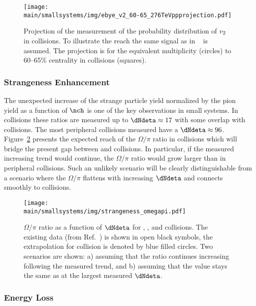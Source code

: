 \documentclass[../report.tex]{subfiles}
\providecommand{\main}{..}
\begin{document}
\begin{figure}[ht]
\centering
\texttt{[image: \\main/smallsystems/img/ebye\_v2\_60-65\_276TeVppprojection.pdf]}

\caption{Projection of the measurement of the probability distribution of $v_{\rm{2}}$ in \pp collisions. To illustrate the reach the same signal as in \PbPb~\cite{Aad:2013xma} is assumed. The projection is for the equivalent \pp multiplicity (circles) to 60--65\% centrality in \PbPb collisions (squares).}
\label{fig:smallsystems_corr_pvn}
\end{figure}

\subsubsection{Strangeness Enhancement}

The unexpected increase of the strange particle yield normalized by the pion yield as a function of $\nch$ is one of the key observations in small systems. In \pp collisions these ratios are measured up to $\dNdeta \approx 17$ with some overlap with \pPb collisions. The most peripheral \PbPb collisions measured have a $\dNdeta \approx 96$. Figure~\ref{fig:smallsystems_strangeness_omega_pi} presents the expected reach of the $\Omega/\pi$ ratio in \pp collisions which will bridge the present gap between \pp and \PbPb collisions. In particular, if the measured increasing trend would continue, the $\Omega/\pi$ ratio would grow larger than in peripheral \PbPb collisions. Such an unlikely scenario will be clearly distinguishable from a scenario where the $\Omega/\pi$ flattens with increasing $\dNdeta$ and connects smoothly to \PbPb collisions. 

\begin{figure}[ht]
\centering
\texttt{[image: \\main/smallsystems/img/strangeness\_omegapi.pdf]}

\caption{$\Omega/\pi$ ratio as a function of $\dNdeta$ for \pp, \pPb, and \PbPb collisions. The existing data (from Ref.~\cite{ALICE:2017jyt}) is shown in open black symbols, the extrapolation for \pp collision is denoted by blue filled circles. Two scenarios are shown: a) assuming that the ratio continues increasing following the measured trend, and b) assuming that the value stays the same as at the largest measured $\dNdeta$.}
\label{fig:smallsystems_strangeness_omega_pi}
\end{figure}

\subsubsection{Energy Loss}
\end{document}

